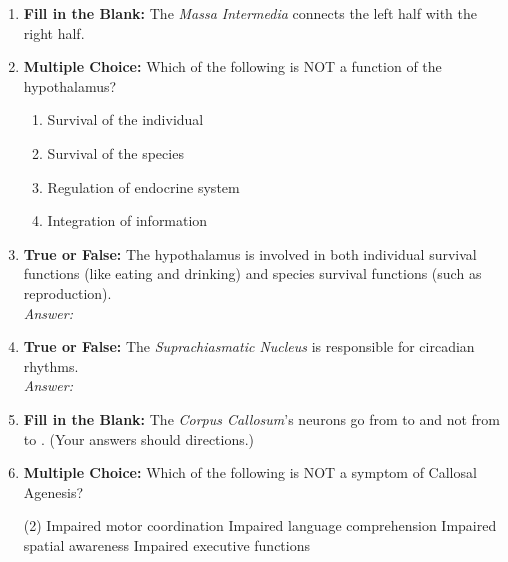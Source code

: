 \begin{enumerate}[label=\textbf{Q1.10.\arabic*}]
      \item \textbf{Fill in the Blank:} The \textit{Massa Intermedia} connects the left \underline{\hspace{3cm}} half with the right half. \\

      \item \textbf{Multiple Choice:} Which of the following is NOT a function of the hypothalamus?
            \begin{enumerate}[label=(\Alph*)]
                  \item Survival of the individual
                  \item Survival of the species
                  \item Regulation of endocrine system
                  \item Integration of information
            \end{enumerate}



      \item \textbf{True or False:} The hypothalamus is involved in both individual survival functions (like eating and drinking) and species survival functions (such as reproduction). \\
            \textit{Answer:} %


      \item \textbf{True or False:} The \textit{Suprachiasmatic Nucleus} is responsible for circadian rhythms. \\
            \textit{Answer:} %

      

      \item \textbf{Fill in the Blank:} The \textit{Corpus Callosum}'s neurons go from \underline{\hspace{3cm}} to \underline{\hspace{3cm}} and not from \underline{\hspace{3cm}} to \underline{\hspace{3cm}}. (Your answers should directions.) \\

      \item \textbf{Multiple Choice:} Which of the following is NOT a symptom of Callosal Agenesis?
            \begin{tasks}[label=\textcolor{\documentTheme}{(\Alph*)}, item-format=\color{\documentTheme}, label-width=1.5em, item-indent=1.7em](2) %
                  \task Impaired motor coordination
                  \task Impaired language comprehension
                  \task Impaired spatial awareness
                  \task Impaired executive functions
            \end{tasks}


\end{enumerate}
